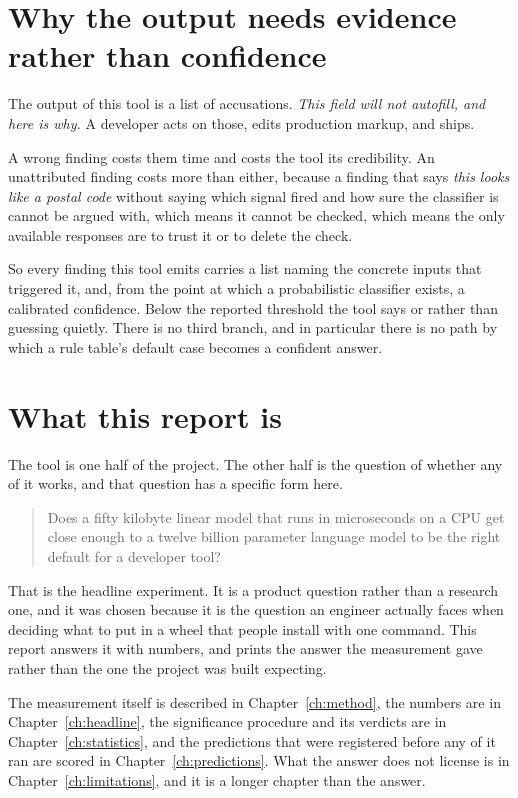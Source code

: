 \section{Why the output needs evidence rather than confidence}

The output of this tool is a list of accusations. \emph{This field will not
autofill, and here is why.} A developer acts on those, edits production markup,
and ships.

A wrong finding costs them time and costs the tool its credibility. An
unattributed finding costs more than either, because a finding that says
\emph{this looks like a postal code} without saying which signal fired and how
sure the classifier is cannot be argued with, which means it cannot be checked,
which means the only available responses are to trust it or to delete the check.

So every finding this tool emits carries a  list naming the
concrete inputs that triggered it, and, from the point at which a probabilistic
classifier exists, a calibrated confidence. Below the reported threshold the
tool says  or  rather than
guessing quietly. There is no third branch, and in particular there is no path
by which a rule table's default case becomes a confident answer.

\section{What this report is}

The tool is one half of the project. The other half is the question of whether
any of it works, and that question has a specific form here.

\begin{quote}
Does a fifty kilobyte linear model that runs in microseconds on a CPU get close
enough to a twelve billion parameter language model to be the right default for
a developer tool?
\end{quote}

That is the headline experiment. It is a product question rather than a research
one, and it was chosen because it is the question an engineer actually faces
when deciding what to put in a wheel that people install with one command. This
report answers it with numbers, and prints the answer the measurement gave
rather than the one the project was built expecting.

The measurement itself is described in Chapter~\ref{ch:method}, the numbers are
in Chapter~\ref{ch:headline}, the significance procedure and its verdicts are in
Chapter~\ref{ch:statistics}, and the predictions that were registered before any
of it ran are scored in Chapter~\ref{ch:predictions}. What the answer does not
license is in Chapter~\ref{ch:limitations}, and it is a longer chapter than the
answer.

